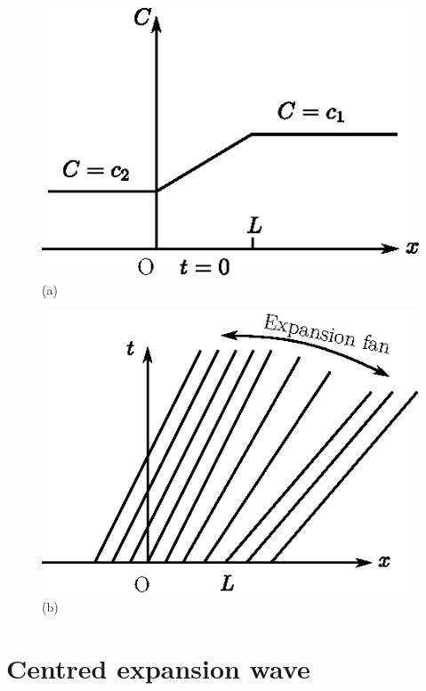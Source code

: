 \begin{center}
\begin{minipage}[b]{5cm}
\begin{figure}[H]
\centering
\includegraphics[scale=.8]{figures/fig61-1.4a.eps}
\caption{(a)}
\label{chap1:fig1.4a}
\end{figure}
\end{minipage}
\qquad
\begin{minipage}[b]{5cm}
\setcounter{figure}{3}
\begin{figure}[H]
\centering
\includegraphics[scale=.8]{figures/fig61-1.4b.eps}
\caption{(b)}
\label{chap1:fig1.4b}
\end{figure}
\end{minipage}
\end{center}

\section{Centred expansion wave}\label{chap1:sec1.4}

